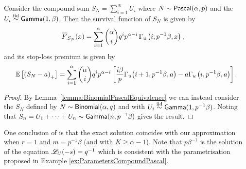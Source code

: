 \begin{corollary} \label{Coro:PascalExponentialStopLoss}
Consider the compound sum $S_N = \sum_{i=1}^N U_i$ where $N \sim \mathsf{Pascal}(\alpha,p)$ and the $U_i \overset{\smash{\mathrm{iid}}}{\sim}\mathsf{Gamma}(1,\beta)$.
Then the survival function of $S_N$ is given by
\begin{align*}
\Ftail_{S_N}(x) &= \sum_{i=1}^\alpha \binom{\alpha}{i} q^i p^{\alpha-i} \, \Gamma_u\left(i, p^{-1}\beta, x\right),
\end{align*}
and its stop-loss premium is given by
\begin{equation*}\label{eq:StopLossCompoundNegBinExp}
\operatorname{{\mathbb E}}\left[\left(S_N-a\right)_{+}\right] = \sum_{i=1}^\alpha \binom{\alpha}{i} q^i p^{\alpha-i} \left[ \frac{i\beta}{p } \Gamma_u\big(i+1, p^{-1} \beta , a \big) - a \Gamma_u\left(i, p^{-1}\beta , a\right) \right].
\end{equation*}
\end{corollary}
\begin{proof}
By Lemma~\ref{lemma:BinomialPascalEquivalence} we can instead consider the $S_N$ defined by $N \sim \mathsf{Binomial}(\alpha,q)$ and with $U_i \overset{\smash{\mathrm{iid}}}{\sim} \mathsf{Gamma}(1,p^{-1} \beta)$.
Noting that $S_n = U_1 + \dots + U_n \sim \mathsf{Gamma}(n, p^{-1} \beta)$ gives the result.
\end{proof}
One conclusion of  is that the exact solution coincides with our approximation when $r=1$ and $m=p^{-1}\beta$ (and with $K \ge \alpha - 1$). Note that $p\beta^{-1}$ is the solution of the equation $\mathscr{L}_{U}(-s)=q^{-1}$ which is consistent with the parametrisation proposed in Example \ref{ex:ParametersCompoundPascal}.\\

